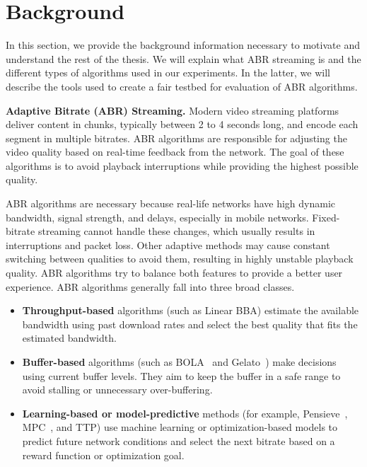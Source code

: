 \vspace{10pt}
\section{Background}\label{s:background}

In this section, we provide the background information necessary to motivate and understand the rest of the thesis. We will explain what ABR streaming is and the different types of algorithms used in our experiments. In the latter, we will describe the tools used to create a fair testbed for evaluation of ABR algorithms.

\textbf{Adaptive Bitrate (ABR) Streaming.} Modern video streaming platforms deliver content in chunks, typically between 2 to 4 seconds long, and encode each segment in multiple bitrates. ABR algorithms are responsible for adjusting the video quality based on real-time feedback from the network. The goal of these algorithms is to avoid playback interruptions while providing the highest possible quality.

ABR algorithms are necessary because real-life networks have high dynamic bandwidth, signal strength, and delays, especially in mobile networks. Fixed-bitrate streaming cannot handle these changes, which usually results in interruptions and packet loss. Other adaptive methods may cause constant switching between qualities to avoid them, resulting in highly unstable playback quality. ABR algorithms try to balance both features to provide a better user experience. ABR algorithms generally fall into three broad classes.

\begin{itemize}
    \item \textbf{Throughput-based} algorithms (such as Linear BBA) estimate the available bandwidth using past download rates and select the best quality that fits the estimated bandwidth.
    
    \item \textbf{Buffer-based} algorithms (such as BOLA~\cite{bola-puffer} and Gelato~\cite{patel2023plume}) make decisions using current buffer levels. They aim to keep the buffer in a safe range to avoid stalling or unnecessary over-buffering.
    
    \item \textbf{Learning-based or model-predictive} methods (for example, Pensieve~\cite{pensieve-sigcomm}, MPC~\cite{mpc}, and TTP) use machine learning or optimization-based models to predict future network conditions and select the next bitrate based on a reward function or optimization goal.
\end{itemize}

